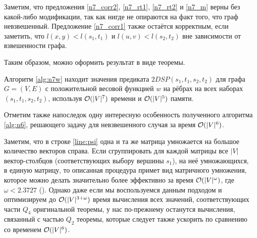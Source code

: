 Заметим, что предложения \ref{n7_corr2}, \ref{n7_rt1}, \ref{n7_rt2} и \ref{n7_m} верны без какой-либо модификации, так как нигде не опираются на факт того, что граф невзвешенный. Предложение \ref{n7_corr1} также остаётся корректным, если заметить, что $l(x, y) < l(s_1, t_1)$ и $l(u, v) < l(s_2, t_2)$ вне зависимости от взвешенности графа.

Таким образом, можно оформить результат в виде теоремы.

\begin{theorem}
Алгоритм \ref{alg:n7w} находит значения предиката $2DSP(s_1, t_1, s_2, t_2)$ для графа $G = (V, E)$ с положительной весовой функцией $w$ на рёбрах на всех наборах $(s_1, t_1, s_2, t_2)$, используя $\mathcal{O}(|V|^7)$ времени и $\mathcal{O}(|V|^5)$ памяти. 
\end{theorem}

Отметим также напоследок одну интересную особенность полученного алгоритма \ref{alg:n6}, решающего задачу для невзвешенного случая за время $\mathcal{O}(|V|^6)$. 

Заметим, что в строке \ref{line:psi} одна и та же матрица умножается на большое количество векторов справа. Если сгруппировать для каждой матрицы все $|V|$ вектор-столбцов (соответствующих выбору вершины $s_1$), на неё умножающихся, в единую матрицу, то описанная процедура примет вид матричного умножения, которое можно делать значительно более эффективно за время $\mathcal{O}(|V|^\omega)$, где $\omega < 2.3727$ (\cite{Williams}). Однако даже если мы воспользуемся данным подходом и оптимизируем до $\mathcal{O}(|V|^{{3 + \omega}})$ время вычисления всех значений, соответствующих части $Q_4$ оригинальной теоремы, у нас по-прежнему останутся вычисления, связанный с частью $Q_2$ теоремы, которые следует также ускорить по сравнению со временем $\mathcal{O}(|V|^6)$.


